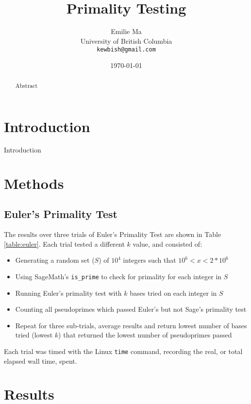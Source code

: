 \documentclass{article}
\title[Primality Testing]{Primality Testing}
\author[Emilie Ma]{%
Emilie Ma\\%
University of British Columbia\\%
\texttt{kewbish@gmail.com}%
}
\date{\today}
\begin{document}
\maketitle
\newpage
\begin{abstract}
    Abstract
\end{abstract}

\section{Introduction}
Introduction

\section{Methods}

\subsection{Euler's Primality Test}
The results over three trials of Euler's Primality Test are shown in Table \ref{table:euler}. Each trial tested a different $k$ value, and consisted of:
\begin{itemize}
    \item{Generating a random set ($S$) of $10^4$ integers such that $10^6 < x < 2*10^6$}
    \item{Using SageMath's \texttt{is\_prime} to check for primality for each integer in $S$}
    \item{Running Euler's primality test with $k$ bases tried on each integer in $S$}
    \item{Counting all pseudoprimes which passed Euler's but not Sage's primality test}
    \item{Repeat for three sub-trials, average results and return lowest number of bases tried (lowest $k$) that returned the lowest number of pseudoprimes passed}
\end{itemize}
Each trial was timed with the Linux \texttt{time} command, recording the real, or total elapsed wall time, spent. 

\section{Results}
\end{document}
